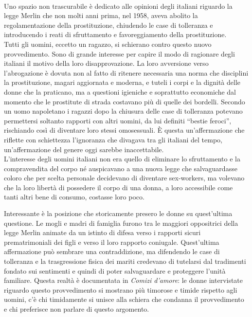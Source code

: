 \paragraph{}Uno spazio non trascurabile è dedicato alle opinioni degli italiani riguardo la legge Merlin che non molti anni prima, nel 1958, aveva abolito la regolamentazione della prostituzione, chiudendo le case di tolleranza e introducendo i reati di sfruttamento e favoreggiamento della prostituzione.
\\Tutti gli uomini, eccetto un ragazzo, si schierano contro questo nuovo provvedimento.
Sono di grande interesse per capire il modo di ragionare degli italiani il motivo della loro disapprovazione.
La loro avversione verso l'abrogazione è dovuta non al fatto di ritenere necessaria una norma che disciplini la prostituzione, magari aggiornata e moderna, e tuteli i corpi e la dignità delle donne che la praticano, ma a questioni igieniche e soprattutto economiche dal momento che le prostitute di strada costavano più di quelle dei bordelli.
Secondo un uomo napoletano i ragazzi dopo la chiusura delle case di tolleranza potevano permettersi soltanto rapporti con altri uomini, da lui definiti \enquote{bestie feroci}, rischiando così di diventare loro stessi omosessuali.
È questa un'affermazione che riflette con schiettezza l'ignoranza che divagava tra gli italiani del tempo, un'affermazione del genere oggi sarebbe inaccettabile.
\\L'interesse degli uomini italiani non era quello di eliminare lo sfruttamento e la compravendita del corpo né auspicavano a una nuova legge che salvaguardasse coloro che per scelta personale decidevano di diventare sex-workers, ma volevano che la loro libertà di possedere il corpo di una donna, a loro accessibile come tanti altri bene di consumo, costasse loro poco.

Interessante è la posizione che storicamente presero le donne su quest'ultima questione.
Le mogli e madri di famiglia furono tra le maggiori oppositrici della legge Merlin animate da un istinto di difesa verso i rapporti sicuri prematrimoniali dei figli  e verso il loro rapporto coniugale.
Quest'ultima affermazione può sembrare una contraddizione, ma difendendo le case di tolleranza e la trasgressione fisica dei mariti credevano di tutelarsi dal tradimenti fondato sui sentimenti e quindi di poter salvaguardare e proteggere l'unità familiare.
Questa realtà è documentata in \textit{Comizi d'amore}: le donne intervistate riguardo questo provvedimento si mostrano più timorose e timide rispetto agli uomini, c'è chi timidamente si unisce alla schiera che condanna il provvedimento e chi preferisce non parlare di questo argomento.

